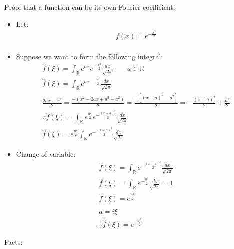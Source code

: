 \documentclass[12pt, a4paper]{article}
\begin{document}
Proof that a function can be its own Fourier coefficient:
\begin{itemize}
    \item Let:
    \begin{gather*}
        f(x) = e^{-\frac{x^2}{2}}\\
    \end{gather*}
    \item Suppose we want to form the following integral:
    \begin{gather*}
        \hat{f}(\xi) = \int_{\mathbb{R}}e^{ax}e^{-\frac{x^2}{2}}\frac{dx}{\sqrt{2\pi}} \qquad a \in \mathbb{R}\\
        \hat{f}(\xi) = \int_{\mathbb{R}}e^{ax-\frac{x^2}{2}}\frac{dx}{\sqrt{2\pi}} \\
        \frac{2ax-x^2}{2} = \frac{-(x^2-2ax+a^2-a^2)}{2} = \frac{-[(x-a)^2-a^2]}{2} = -\frac{(x-a)^2}{2}+\frac{a^2}{2}\\
        \therefore \hat{f}(\xi) = \int_{\mathbb{R}}e^{\frac{a^2}{2}}e^{-\frac{(x-a)^2}{2}}\frac{dx}{\sqrt{2\pi}}\\
        \hat{f}(\xi) = e^{\frac{a^2}{2}}\int_{\mathbb{R}}e^{-\frac{(x-a)^2}{2}}\frac{dx}{\sqrt{2\pi}}
    \end{gather*}
    \item Change of variable:
    \begin{gather*}
        \hat{f}(\xi) =\int_{\mathbb{R}}e^{-\frac{(x-a)^2}{2}}\frac{dx}{\sqrt{2\pi}}\\
        \hat{f}(\xi) =\int_{\mathbb{R}}e^{-\frac{y^2}{2}}\frac{dy}{\sqrt{2\pi}} = 1\\
        \hat{f}(\xi) = e^{\frac{a^2}{2}}\\\\
        a = i\xi\\
        \therefore \hat{f}(\xi) = e^{-\frac{\xi^2}{2}}
    \end{gather*}
\end{itemize}
Facts:
\end{document}

